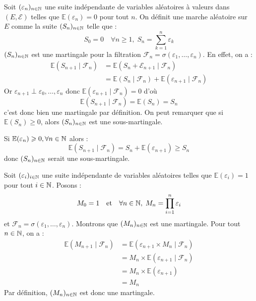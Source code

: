 \begin{example}
    Soit $( \varepsilon_n)_{n \in \mathbb{N}}$ une suite indépendante de variables aléatoires 
    à valeurs dans $(E, \mathcal{E})$ telles que $ \mathbb{E}( \varepsilon_n) = 0$ pour tout $n$. 
    On définit une marche aléatoire sur $E$ comme la suite $(S_n)_{n \in \mathbb{N}}$ telle que : 
        $$ S_0 = 0 \quad \forall n \geqslant 1, \; S_n = \sum_{k=1}^{n} \varepsilon_k $$ 
    $(S_n)_{n \in \mathbb{N}}$ est une martingale pour la filtration $ \mathcal{F}_n = \sigma( \varepsilon_1, \dots, \varepsilon_n)$. 
    En effet, on a : 
        \begin{align*}
            \mathbb{E}(S_{n+1} \mid \mathcal{F}_n) &= \mathbb{E}(S_n + \mathcal{E}_{n+1} \mid \mathcal{F}_n) \\ 
            &= \mathbb{E}(S_n \mid \mathcal{F}_n) + \mathbb{E}( \varepsilon_{n+1} \mid \mathcal{F}_n) 
        \end{align*}
    Or $ \varepsilon_{n+1} \perp \varepsilon_0, \dots, \varepsilon_n$ donc $ \mathbb{E}( \varepsilon_{n+1} \mid \mathcal{F}_n) = 0 $ d'où 
        $$ \mathbb{E}( S_{n+1} \mid \mathcal{F}_n) = \mathbb{E}(S_n) = S_n $$ 
    c'est donc bien une martingale par définition. On peut remarquer que si $ \mathbb{E}(S_n) \geqslant 0$, alors 
    $(S_n)_{n \in \mathbb{N}}$ est une sous-martingale. 
\end{example}


\begin{remark}
    Si $ \mathbb{E}( \varepsilon_n) \geqslant 0, \forall n \in \mathbb{N}$ alors : 
        $$ \mathbb{E}( S_{n+1} \mid \mathcal{F}_n) = S_n + \mathbb{E}( \varepsilon_{n+1}) \geqslant S_n $$ 
    donc $(S_n)_{n \in \mathbb{N}}$ serait une sous-martingale. 
\end{remark}

\begin{example}[Multiplicatif]
    Soit $( \varepsilon_i)_{i \in \mathbb{N}}$ une suite indépendante de variables aléatoires telles que $ \mathbb{E}( \varepsilon_i) = 1$ pour 
    tout $ i \in \mathbb{N}$. Posons : 
        $$ M_0 = 1 \quad \text{et} \quad \forall n \in \mathbb{N}, \; M_n = \prod_{i = 1}^{n} \varepsilon_i $$ 
    et $ \mathcal{F}_n = \sigma ( \varepsilon_1, \dots, \varepsilon_n)$. Montrons que $(M_n)_{n \in \mathbb{N}}$ est une 
    martingale. Pour tout $ n \in \mathbb{N}$, on a : 
        \begin{align*}
            \mathbb{E}(M_{n+1} \mid \mathcal{F}_n) &= \mathbb{E} \left( \varepsilon_{n+1} \times M_n \mid \mathcal{F}_n\right) \\ 
            &= M_n \times \mathbb{E}( \varepsilon_{n+1} \mid \mathcal{F}_n) \\
            &= M_n \times \mathbb{E}( \varepsilon_{n+1}) \\ 
            &= M_n 
        \end{align*}
    Par définition, $(M_n)_{n \in \mathbb{N}}$ est donc une martingale. 
\end{example}

